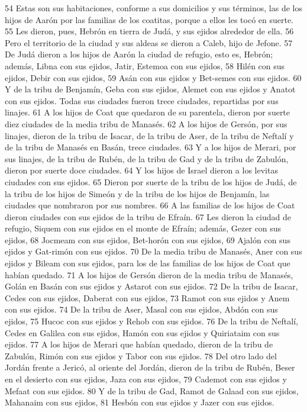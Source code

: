 54 Estas son sus habitaciones, conforme a sus domicilios y sus términos, las de los hijos de Aarón por las familias de los coatitas, porque a ellos les tocó en suerte.
55 Les dieron, pues, Hebrón en tierra de Judá, y sus ejidos alrededor de ella.
56 Pero el territorio de la ciudad y sus aldeas se dieron a Caleb, hijo de Jefone.
57 De Judá dieron a los hijos de Aarón la ciudad de refugio, esto es, Hebrón; además, Libna con sus ejidos, Jatir, Estemoa con sus ejidos,
58 Hilén con sus ejidos, Debir con sus ejidos,
59 Asán con sus ejidos y Bet-semes con sus ejidos.
60 Y de la tribu de Benjamín, Geba con sus ejidos, Alemet con sus ejidos y Anatot con sus ejidos. Todas sus ciudades fueron trece ciudades, repartidas por sus linajes.
61 A los hijos de Coat que quedaron de su parentela, dieron por suerte diez ciudades de la media tribu de Manasés.
62 A los hijos de Gersón, por sus linajes, dieron de la tribu de Isacar, de la tribu de Aser, de la tribu de Neftalí y de la tribu de Manasés en Basán, trece ciudades.
63 Y a los hijos de Merari, por sus linajes, de la tribu de Rubén, de la tribu de Gad y de la tribu de Zabulón, dieron por suerte doce ciudades.
64 Y los hijos de Israel dieron a los levitas ciudades con sus ejidos.
65 Dieron por suerte de la tribu de los hijos de Judá, de la tribu de los hijos de Simeón y de la tribu de los hijos de Benjamín, las ciudades que nombraron por sus nombres.
66 A las familias de los hijos de Coat dieron ciudades con sus ejidos de la tribu de Efraín.
67 Les dieron la ciudad de refugio, Siquem con sus ejidos en el monte de Efraín; además, Gezer con sus ejidos,
68 Jocmeam con sus ejidos, Bet-horón con sus ejidos,
69 Ajalón con sus ejidos y Gat-rimón con sus ejidos.
70 De la media tribu de Manasés, Aner con sus ejidos y Bileam con sus ejidos, para los de las familias de los hijos de Coat que habían quedado.
71 A los hijos de Gersón dieron de la media tribu de Manasés, Golán en Basán con sus ejidos y Astarot con sus ejidos.
72 De la tribu de Isacar, Cedes con sus ejidos, Daberat con sus ejidos,
73 Ramot con sus ejidos y Anem con sus ejidos.
74 De la tribu de Aser, Masal con sus ejidos, Abdón con sus ejidos,
75 Hucoc con sus ejidos y Rehob con sus ejidos.
76 De la tribu de Neftalí, Cedes en Galilea con sus ejidos, Hamón con sus ejidos y Quiriataim con sus ejidos.
77 A los hijos de Merari que habían quedado, dieron de la tribu de Zabulón, Rimón con sus ejidos y Tabor con sus ejidos.
78 Del otro lado del Jordán frente a Jericó, al oriente del Jordán, dieron de la tribu de Rubén, Beser en el desierto con sus ejidos, Jaza con sus ejidos,
79 Cademot con sus ejidos y Mefaat con sus ejidos.
80 Y de la tribu de Gad, Ramot de Galaad con sus ejidos, Mahanaim con sus ejidos,
81 Hesbón con sus ejidos y Jazer con sus ejidos.


